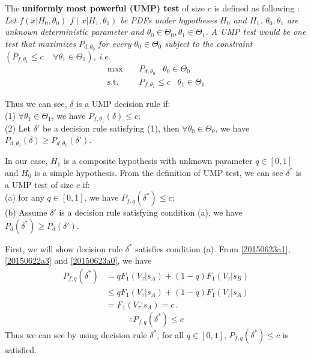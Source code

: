  The \textbf{uniformly most powerful (UMP) test} of size $c$ is defined as following \cite{LehmannTest, poor1994introduction, casella2002statistical}:
\textit{
  Let $f(x|H_0, \theta_0)$ $f(x|H_1, \theta_1)$ be PDFs under hypotheses $H_0$ and $H_1$. $\theta_0, \theta_1$ are unknown deterministic parameter and $\theta_0 \in \Theta_0, \theta_1 \in \Theta_1$. A UMP test would be one test that maximizes $P_{d, \theta_0}$ for every  $\theta_0 \in \Theta_0$ subject to the constraint $(P_{f,\theta_1} \leq c\;\;\;\;\forall \theta_1 \in \Theta_1)$, i.e. }
\begin{equation}
  \begin{split}
    \max\;\;\;\;&P_{d, \theta_0}\;\;\;\theta_0 \in \Theta_0\\
    \text{s.t.}\;\;\;\;&P_{f, \theta_1} \leq c\;\;\;\theta_1 \in \Theta_1
  \end{split}
\end{equation}

Thus we can see,  $\delta$ is a UMP decision rule if: 
  \\(1) $\forall \theta_1 \in \Theta_1$, we have $P_{f, \theta_1}(\delta) \leq c$;
  \\(2) Let $\delta'$ be a decision rule satisfying (1), then  $\forall \theta_0 \in \Theta_0$, we have $P_{d,\theta_0}(\delta) \geq P_{d, \theta_0}(\delta')$. 

In our case, $H_1$ is a composite hypothesis with unknown parameter $q \in [0, 1]$ and $H_0$ is a simple hypothesis. From the definition of UMP test,  we can see $\delta^\ast$ is a UMP test of size $c$ if:
\\(a) for any $q \in [0, 1]$, we have $P_{f,q}(\delta^\ast) \leq c$;
\\(b) Assume $\delta'$ is a decision rule satisfying condition (a), we have $P_d(\delta^\ast) \geq P_d(\delta')$.  

First, we will show decision rule $\delta^\ast$ satisfies condition (a). From \eqref{20150623a1}, \eqref{20150622a3} and \eqref{20150623a0}, we have 
\begin{equation}
  \begin{split}
    P_{f,q}(\delta^\ast) &= qF_1(V_\tau|s_A) + (1-q)F_1(V_\tau|s_B)\\
    &\leq qF_1(V_\tau|s_A) + (1-q)F_1(V_\tau|s_A)\\
    &= F_1(V_\tau|s_A) = c\,.
  \end{split}
\end{equation}
\begin{equation}
  \therefore P_{f,q}(\delta^\ast) \leq c
  \label{20150705a1}
\end{equation}
Thus we can see by using decision rule $\delta^\ast$, for all $q \in [0, 1]$, $P_{f,q}(\delta^\ast) \leq c$ is satisfied.

